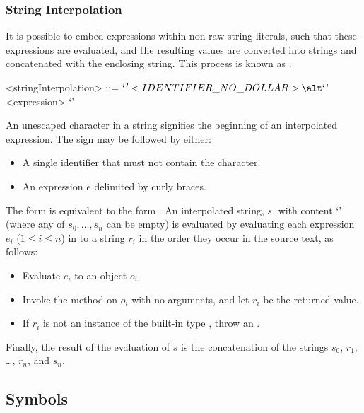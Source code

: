 \documentclass[makeidx]{article}
\begin{document}
\subsubsection{String Interpolation}

\LMHash{}%
It is possible to embed expressions within non-raw string literals, such that these expressions are evaluated, and the resulting values are converted into strings and concatenated with the enclosing string.
This process is known as .

\begin{grammar}
<stringInterpolation> ::= `$' <IDENTIFIER\_NO\_DOLLAR>
  \alt `${' <expression> `}'
\end{grammar}


\LMHash{}%
An unescaped  character in a string signifies the beginning of an interpolated expression.
The  sign may be followed by either:
\begin{itemize}
\item A single identifier \id{} that must not contain the  character.
\item An expression $e$ delimited by curly braces.
\end{itemize}

\LMHash{}%
The form \code{\$\id} is equivalent to the form \code{\$\{\id\}}.
An interpolated string, $s$, with content
`' (where any of $s_0, \ldots, s_n$ can be empty)
is evaluated by evaluating each expression $e_i$ ($1 \le i \le n$) in to a string $r_i$ in the order they occur in the source text, as follows:
\begin{itemize}
\item{} Evaluate $e_i$ to an object $o_i$.
\item{} Invoke the  method on $o_i$ with no arguments, and let
 $r_i$ be the returned value.
\item{} If $r_i$ is not an instance of the built-in type , throw an .
\end{itemize}
Finally, the result of the evaluation of $s$ is the concatenation of the strings $s_0$, $r_1$, \ldots, $r_n$, and $s_n$.


\subsection{Symbols}
\end{document}
